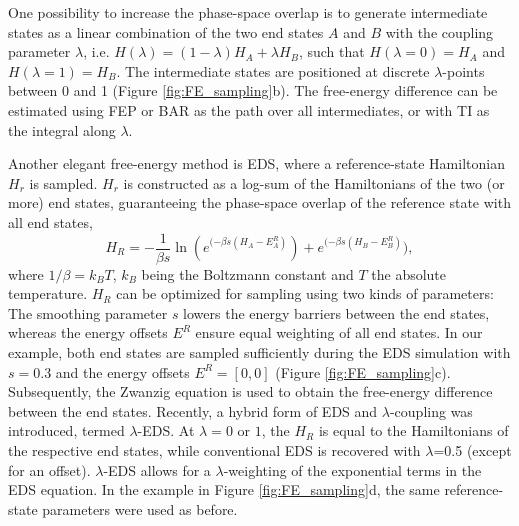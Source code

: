 One possibility to increase the phase-space overlap is to generate intermediate states as a linear combination of the two end states $A$ and $B$ with the coupling parameter $\lambda$, i.e. $H(\lambda) = (1-\lambda) H_A + \lambda H_B$, such that $H(\lambda=0) = H_A$ and $H(\lambda=1) = H_B$.
The intermediate states are positioned at discrete $\lambda$-points between 0 and 1 (Figure \ref{fig:FE_sampling}b).\cite{Valleau1972, Straatsma1991} 
The free-energy difference can be estimated using FEP\cite{Zwanzig1954} or BAR\cite{Bennett1976} as the path over all intermediates, or with TI\cite{Kirkwood1935} as the integral along $\lambda$. 

Another elegant free-energy method is EDS,\cite{Christ2007, Christ2008} where a reference-state Hamiltonian $H_r$ is sampled. $H_r$ is constructed as a log-sum of the Hamiltonians of the two (or more) end states, guaranteeing the phase-space overlap of the reference state with all end states,
\begin{equation}
H_R = - \frac{1}{\beta s} \ln( e^{(- \beta s (H_A - E^R_A)}) +e^{(- \beta s (H_B - E^R_B)}),
\end{equation}
where $1/\beta=k_{B}T$, $k_B$ being the Boltzmann constant and $T$ the absolute temperature.
$H_R$ can be optimized for sampling using two kinds of parameters: The smoothing parameter $s$ lowers the energy barriers between the end states, whereas the energy offsets $E^R$ ensure equal weighting of all end states. In our example, both end states are sampled sufficiently during the EDS simulation with $s=0.3$ and the energy offsets $E^R=[0,0]$ (Figure \ref{fig:FE_sampling}c). Subsequently, the Zwanzig equation\cite{Zwanzig1954} is used to obtain the free-energy difference between the end states.\cite{Christ2007, Christ2008}
Recently, a hybrid form of EDS and $\lambda$-coupling was introduced, termed $\lambda$-EDS.\cite{Koenig2020} At $\lambda=0$ or $1$, the $H_R$ is equal to the Hamiltonians of the respective end states, while conventional EDS is recovered with $\lambda$=0.5 (except for an offset).\cite{Koenig2020}
$\lambda$-EDS allows for a $\lambda$-weighting of the exponential terms in the EDS equation. In the example in Figure \ref{fig:FE_sampling}d, the same reference-state parameters were used as before.

